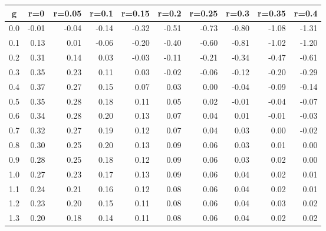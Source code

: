 %
\begin{table}[!tbp]
 \begin{center}
 \begin{tabular}{rrrrrrrrrr}\hline\hline
\multicolumn{1}{c}{g}&\multicolumn{1}{c}{r=0}&\multicolumn{1}{c}{r=0.05}&\multicolumn{1}{c}{r=0.1}&\multicolumn{1}{c}{r=0.15}&\multicolumn{1}{c}{r=0.2}&\multicolumn{1}{c}{r=0.25}&\multicolumn{1}{c}{r=0.3}&\multicolumn{1}{c}{r=0.35}&\multicolumn{1}{c}{r=0.4}\tabularnewline
\hline
0.0&-0.01&-0.04&-0.14&-0.32&-0.51&-0.73&-0.80&-1.08&-1.31\tabularnewline
0.1& 0.13& 0.01&-0.06&-0.20&-0.40&-0.60&-0.81&-1.02&-1.20\tabularnewline
0.2& 0.31& 0.14& 0.03&-0.03&-0.11&-0.21&-0.34&-0.47&-0.61\tabularnewline
0.3& 0.35& 0.23& 0.11& 0.03&-0.02&-0.06&-0.12&-0.20&-0.29\tabularnewline
0.4& 0.37& 0.27& 0.15& 0.07& 0.03& 0.00&-0.04&-0.09&-0.14\tabularnewline
0.5& 0.35& 0.28& 0.18& 0.11& 0.05& 0.02&-0.01&-0.04&-0.07\tabularnewline
0.6& 0.34& 0.28& 0.20& 0.13& 0.07& 0.04& 0.01&-0.01&-0.03\tabularnewline
0.7& 0.32& 0.27& 0.19& 0.12& 0.07& 0.04& 0.03& 0.00&-0.02\tabularnewline
0.8& 0.30& 0.25& 0.20& 0.13& 0.09& 0.06& 0.03& 0.01& 0.00\tabularnewline
0.9& 0.28& 0.25& 0.18& 0.12& 0.09& 0.06& 0.03& 0.02& 0.00\tabularnewline
1.0& 0.27& 0.23& 0.17& 0.13& 0.09& 0.06& 0.04& 0.02& 0.01\tabularnewline
1.1& 0.24& 0.21& 0.16& 0.12& 0.08& 0.06& 0.04& 0.02& 0.01\tabularnewline
1.2& 0.23& 0.20& 0.15& 0.11& 0.08& 0.06& 0.04& 0.03& 0.02\tabularnewline
1.3& 0.20& 0.18& 0.14& 0.11& 0.08& 0.06& 0.04& 0.02& 0.02\tabularnewline
\hline
\end{tabular}

\end{center}

\end{table}

